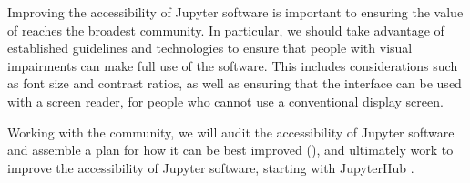\begin{task}[
  title=Accessibility in Jupyter,
  id=accessibility,
  lead=SRL,
  PM=12,
  wphases={12-36},
  partners={}
]

  Improving the accessibility of Jupyter software
  is important to ensuring the value of \TheProject reaches the broadest community.
  In particular, we should take advantage of established guidelines and
  technologies to ensure that people with visual impairments can make full use
  of the software.
  This includes considerations such as font size and contrast ratios,
  as well as ensuring that the interface can be used with a screen reader,
  for people who cannot use a conventional display screen.

  Working with the community, we will audit the accessibility of Jupyter software and assemble a plan for how it can be best improved
  (),
  and ultimately work to improve the accessibility of Jupyter software,
  starting with JupyterHub .
\end{task}
